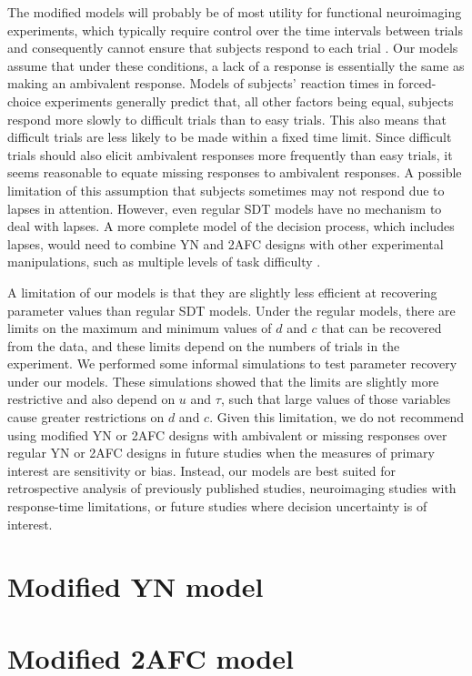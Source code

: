 \documentclass[man]{apa6}
\begin{document}
The modified models will probably be of most utility for functional neuroimaging experiments, which typically require control over the time intervals between trials and consequently cannot ensure that subjects respond to each trial \parencite[e.g.][]{kreitewolfhemispheric2014}. Our models assume that under these conditions, a lack of a response is essentially the same as making an ambivalent response. Models of subjects' reaction times in forced-choice experiments \parencite[e.g.,][]{ratcliffthe2008} generally predict that, all other factors being equal, subjects respond more slowly to difficult trials than to easy trials. This also means that difficult trials are less likely to be made within a fixed time limit. Since difficult trials should also elicit ambivalent responses more frequently than easy trials, it seems reasonable to equate missing responses to ambivalent responses. A possible limitation of this assumption that subjects sometimes may not respond due to lapses in attention. However, even regular SDT models have no mechanism to deal with lapses. A more complete model of the decision process, which includes lapses, would need to combine YN and 2AFC designs with other experimental manipulations, such as multiple levels of task difficulty \parencite[see][]{goldhow2013}.

A limitation of our models is that they are slightly less efficient at recovering parameter values than regular SDT models. Under the regular models, there are limits on the maximum and minimum values of $d$ and $c$ that can be recovered from the data, and these limits depend on the numbers of trials in the experiment. We performed some informal simulations to test parameter recovery under our models. These simulations showed that the limits are slightly more restrictive and also depend on $u$ and $\tau$, such that large values of those variables cause greater restrictions on $d$ and $c$. Given this limitation, we do not recommend using modified YN or 2AFC designs with ambivalent or missing responses over regular YN or 2AFC designs in future studies when the measures of primary interest are sensitivity or bias. Instead, our models are best suited for retrospective analysis of previously published studies, neuroimaging studies with response-time limitations, or future studies where decision uncertainty is of interest.



\printbibliography

\appendix
\label{app:b}
\section{Modified YN model}

\appendix
\appendix
\label{app:c}
\section{Modified 2AFC model}

\end{document}
